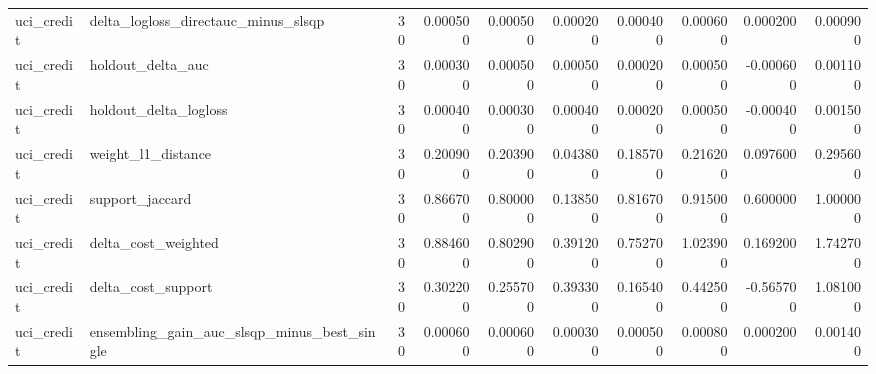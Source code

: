 \begin{landscape}
\begin{longtable}{llrrrrrrrr}
uci\_credit & delta\_logloss\_directauc\_minus\_slsqp & 30 & 0.000500 & 0.000500 & 0.000200 & 0.000400 & 0.000600 & 0.000200 & 0.000900 \\
uci\_credit & holdout\_delta\_auc & 30 & 0.000300 & 0.000500 & 0.000500 & 0.000200 & 0.000500 & -0.000600 & 0.001100 \\
uci\_credit & holdout\_delta\_logloss & 30 & 0.000400 & 0.000300 & 0.000400 & 0.000200 & 0.000500 & -0.000400 & 0.001500 \\
uci\_credit & weight\_l1\_distance & 30 & 0.200900 & 0.203900 & 0.043800 & 0.185700 & 0.216200 & 0.097600 & 0.295600 \\
uci\_credit & support\_jaccard & 30 & 0.866700 & 0.800000 & 0.138500 & 0.816700 & 0.915000 & 0.600000 & 1.000000 \\
uci\_credit & delta\_cost\_weighted & 30 & 0.884600 & 0.802900 & 0.391200 & 0.752700 & 1.023900 & 0.169200 & 1.742700 \\
uci\_credit & delta\_cost\_support & 30 & 0.302200 & 0.255700 & 0.393300 & 0.165400 & 0.442500 & -0.565700 & 1.081000 \\
uci\_credit & ensembling\_gain\_auc\_slsqp\_minus\_best\_single & 30 & 0.000600 & 0.000600 & 0.000300 & 0.000500 & 0.000800 & 0.000200 & 0.001400 \\
\end{longtable}\endgroup\addtocounter{table}{-1}

\end{landscape}
